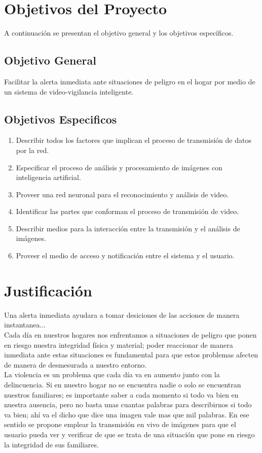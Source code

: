 \section{Objetivos del Proyecto}
A continuación se presentan el objetivo general y los objetivos específicos.

\subsection{Objetivo General}
Facilitar la alerta inmediata ante situaciones de peligro en el hogar por medio de un sistema de video-vigilancia inteligente.

\subsection{Objetivos Especificos}
\begin{enumerate}
    \item Describir todos los factores que implican el proceso de transmisión de datos por la red.
    \item Especificar el proceso de análisis y procesamiento de imágenes con inteligencia artificial.
    \item Proveer una red neuronal para el reconocimiento y análisis de video.
    \item Identificar las partes que conforman el proceso de transmisión de video.
    \item Describir medios para la interacción entre la transmisión y el análisis de imágenes.
    \item Proveer el medio de acceso y notificación entre el sistema y el usuario.
\end{enumerate}

\section{Justificación}

Una alerta inmediata ayudara a tomar desiciones de las acciones de manera instantanea...\\

Cada día en nuestros hogares nos enfrentamos a situaciones de peligro que ponen en riesgo nuestra integridad física y material; poder reaccionar de manera inmediata ante estas situaciones es fundamental para que estos problemas afecten de manera de desmesurada a nuestro entorno.\\

La violencia es un problema que cada día va en aumento junto con la delincuencia. Si en nuestro hogar no se encuentra nadie o solo se encuentran nuestros familiares; es importante saber a cada momento si todo va bien en nuestra ausencia, pero no basta unas cuantas palabras para describirnos 
si todo va bien; ahí va el dicho que dice una imagen vale mas que mil palabras. En ese sentido se propone emplear la transmisión en vivo de imágenes para que el usuario pueda ver y verificar de que se trata de una situación que pone en riesgo la integridad de sus familiares.

